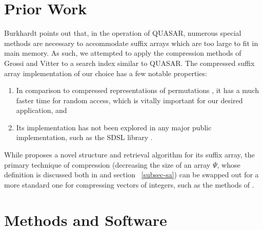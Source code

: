 \documentclass{article}
\begin{document}
\section{Prior Work}
\label{sec-prior-work}
Burkhardt \cite{B99} points out that, in the operation of QUASAR, numerous special methods are necessary to accommodate suffix arrays which are too large to fit in main memory. As such, we attempted to apply the compression methods of Grossi and Vitter \cite{GV05} to a search index similar to QUASAR. The compressed suffix array implementation of our choice has a few notable properties:
\begin{enumerate}
\item In comparison to compressed representations of permutations \cite{BN08}, it has a much faster time for random access, which is vitally important for our desired application, and
\item Its implementation has not been explored in any major public implementation, such as the SDSL library \cite{SDSL}.
\end{enumerate}
While \cite{GV05} proposes a novel structure and retrieval algorithm for its suffix array, the primary technique of compression (decreasing the size of an array $\Psi$, whose definition is discussed both in \cite{GV05} and section ~\ref{subsec-sa}) can be swapped out for a more standard one for compressing vectors of integers, such as the methods of \cite{E75}.

\section{Methods and Software}
\label{sec-methods-software}
\end{document}
